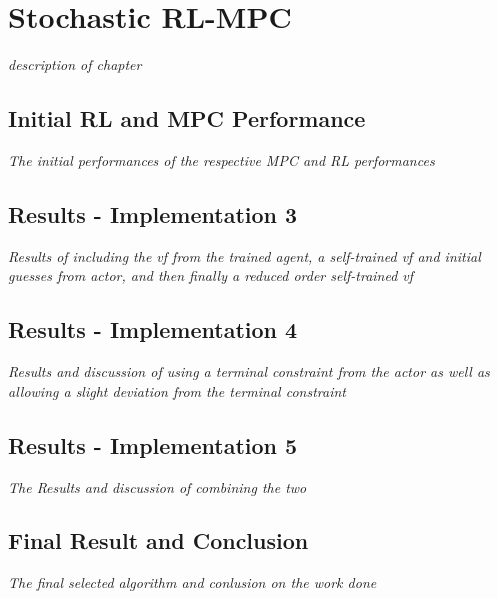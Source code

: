 \chapter{Stochastic RL-MPC}
\label{chapter:stochastic_RL_MPC}

\emph{description of chapter}

\section{Initial RL and MPC Performance}
\emph{The initial performances of the respective MPC and RL performances}

\section{Results - Implementation 3}
\emph{Results of including the vf from the trained agent, a self-trained vf and initial guesses from actor, and then finally a reduced order self-trained vf}

\section{Results - Implementation 4}
\emph{Results and discussion of using a terminal constraint from the actor as well as allowing a slight deviation from the terminal constraint}

\section{Results - Implementation 5}
\emph{The Results and discussion of combining the two}


\section{Final Result and Conclusion}
\emph{The final selected algorithm and conlusion on the work done}